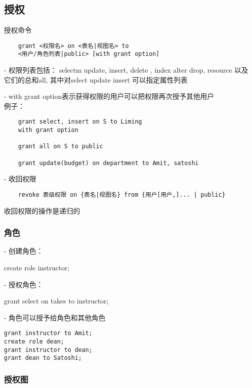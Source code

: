 \documentclass{article}        %
\begin{document}
\subsection{授权}

授权命令

\begin{verbatim}
    grant <权限名> on <表名|视图名> to 
    <用户/角色列表|public> [with grant option] 
\end{verbatim}

- 权限列表包括： selectm update, insert, delete , index 
alter drop, resource 以及它们的总和all, 其中对select update insert 可以指定属性列表 

- with grant option表示获得权限的用户可以把权限再次授予其他用户\\ 

例子：

\begin{verbatim}
    grant select, insert on S to Liming 
    with grant option 

    grant all on S to public 

    grant update(budget) on department to Amit, satoshi
\end{verbatim}

- 收回权限

\begin{verbatim}
    revoke 表级权限 on {表名|视图名} from {用户[用户,]... | public}
\end{verbatim}

收回权限的操作是递归的

\subsubsection{角色}

- 创建角色：

create role instructor; 

- 授权角色： 

grant select on takes to instructor;

- 角色可以授予给角色和其他角色 

\begin{verbatim}
grant instructor to Amit; 
create role dean; 
grant instructor to dean; 
grant dean to Satoshi;
\end{verbatim}

\subsubsection{授权图}
\end{document}
